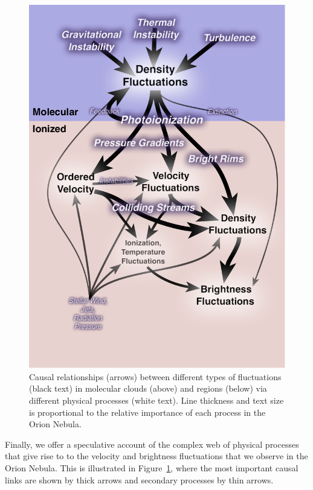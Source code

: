 \documentclass[useAMS,usenatbib]{mn2e}
\begin{document}
\begin{figure}
  \centering
  \includegraphics[width=\linewidth]{causality-flow}
  \caption{Causal relationships (arrows) between different types of
    fluctuations (black text) in molecular clouds (above) and \hii{}
    regions (below) via different physical processes (white text).
    Line thickness and text size is proportional to the relative
    importance of each process in the Orion Nebula.}
  \label{fig:causality-flow}
\end{figure}


Finally, we offer a speculative account of the complex web of physical
processes that give rise to to the velocity and brightness
fluctuations that we observe in the Orion Nebula.  This is illustrated
in Figure~\ref{fig:causality-flow}, where the most important causal
links are shown by thick arrows and secondary processes by thin
arrows.  
\end{document}
